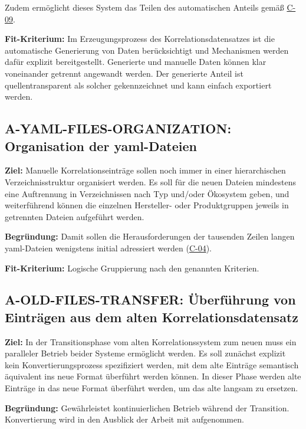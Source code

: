 Zudem ermöglicht dieses System das Teilen des automatischen Anteils gemäß \hyperref[subsec:c-09-sharing-of-public-data]{C-09}.

\textbf{Fit-Kriterium:}
Im Erzeugungsprozess des Korrelationsdatensatzes ist die automatische Generierung von Daten berücksichtigt und Mechanismen werden dafür explizit bereitgestellt.
Generierte und manuelle Daten können klar voneinander getrennt angewandt werden.
Der generierte Anteil ist quellentransparent als solcher gekennzeichnet und kann einfach exportiert werden.

\subsection{A-YAML-FILES-ORGANIZATION: Organisation der \acrshort{yaml}-Dateien}\label{subsec:req-yaml-file-organization}

\textbf{Ziel:}
Manuelle Korrelationseinträge sollen noch immer in einer hierarchischen Verzeichnisstruktur organisiert werden.
Es soll für die neuen Dateien mindestens eine Auftrennung in Verzeichnissen nach Typ und/oder Ökosystem geben, und weiterführend können die einzelnen Hersteller- oder Produktgruppen jeweils in getrennten Dateien aufgeführt werden.

\textbf{Begründung:}
Damit sollen die Herausforderungen der tausenden Zeilen langen \acrshort{yaml}-Dateien wenigstens initial adressiert werden (\hyperref[subsec:c-04-groe-und-unubersichtliche-yaml-dateien]{C-04}).

\textbf{Fit-Kriterium:}
Logische Gruppierung nach den genannten Kriterien.

\subsection{A-OLD-FILES-TRANSFER: Überführung von Einträgen aus dem alten Korrelationsdatensatz}\label{subsec:req-current-dataset-conversion}

\textbf{Ziel:}
In der Transitionsphase vom alten Korrelationssystem zum neuen muss ein paralleler Betrieb beider Systeme ermöglicht werden.
Es soll zunächst explizit kein Konvertierungsprozess spezifiziert werden, mit dem alte Einträge semantisch äquivalent ins neue Format überführt werden können.
In dieser Phase werden alte Einträge in das neue Format überführt werden, um das alte langsam zu ersetzen.

\textbf{Begründung:}
Gewährleistet kontinuierlichen Betrieb während der Transition.
Konvertierung wird in den Ausblick der Arbeit mit aufgenommen.

